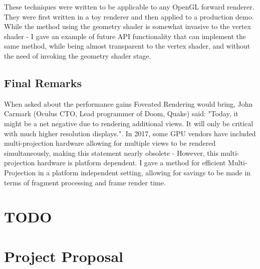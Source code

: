 \documentclass[12pt,a4paper,twoside,openright]{report}
\begin{document}
These techniques were written to be applicable to any OpenGL forward renderer. They were first written in a toy renderer and then applied to a production demo.\\
While the method using the geometry shader is somewhat invasive to the vertex shader - I gave an example of future API functionality that can implement the same method, while being almost transparent to the vertex shader, and without the need of invoking the geometry shader stage.

\section{Final Remarks}

When asked about the performance gains Foveated Rendering would bring, John Carmark (Oculus CTO, Lead programmer of Doom, Quake) said: "Today, it might be a net negative due to rendering additional views. It will only be critical with much higher resolution displays.". In 2017, some GPU vendors have included multi-projection hardware allowing for multiple views to be rendered simultaneously, making this statement nearly obsolete - However, this multi-projection hardware is platform dependent. I gave a method for efficient Multi-Projection in a platform independent setting, allowing for savings to be made in terms of fragment processing and frame render time.



\appendix

\chapter{TODO}

\chapter{Project Proposal}


\end{document}
